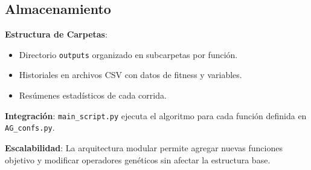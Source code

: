 \subsection{Almacenamiento}
\textbf{Estructura de Carpetas}:
\begin{itemize}
    \item Directorio \texttt{outputs} organizado en subcarpetas por funci\'on.
    \item Historiales en archivos CSV con datos de fitness y variables.
    \item Res\'umenes estad\'isticos de cada corrida.
\end{itemize}

\textbf{Integraci\'on}: \texttt{main\_script.py} ejecuta el algoritmo para cada funci\'on definida en \texttt{AG\_confs.py}.

\textbf{Escalabilidad}: La arquitectura modular permite agregar nuevas funciones objetivo y modificar operadores gen\'eticos sin afectar la estructura base.